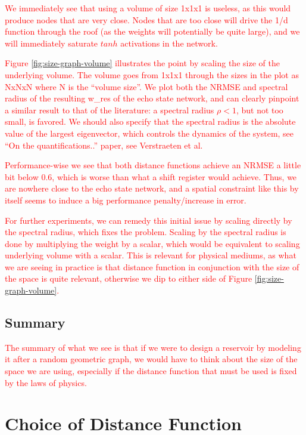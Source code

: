 \textcolor{red}{
  We immediately see that using a volume of size 1x1x1 is useless, as this would
produce nodes that are very close. Nodes that are too close will drive the 1/d
function through the roof (as the weights will potentially be quite large), and
we will immediately saturate $tanh$ activations in the network.
}

\textcolor{red}{
  Figure \ref{fig:size-graph-volume} illustrates the point by scaling the size
of the underlying volume. The volume goes from 1x1x1 through the sizes in the
plot as NxNxN where N is the ``volume size''. We plot both the NRMSE and
spectral radius of the resulting w_res of the echo state network, and can
clearly pinpoint a similar result to that of the literature: a spectral radius
$\rho < 1$, but not too small, is favored. We should also specify that the
spectral radius is the absolute value of the largest eigenvector, which controls
the dynamics of the system, see ``On the quantifications..'' paper, see
Verstraeten et al.
}

\textcolor{red}{
  Performance-wise we see that both distance functions achieve an NRMSE a little
bit below 0.6, which is worse than what a shift register would achieve. Thus, we
are nowhere close to the echo state network, and a spatial constraint like this
by itself seems to induce a big performance penalty/increase in error.
}

\textcolor{red}{
  For further experiments, we can remedy this initial issue by scaling directly
by the spectral radius, which fixes the problem. Scaling by the spectral radius
is done by multiplying the weight by a scalar, which would be equivalent to
scaling underlying volume with a scalar. This is relevant for physical mediums,
as what we are seeing in practice is that distance function in conjunction with
the size of the space is quite relevant, otherwise we dip to either side of
Figure \ref{fig:size-graph-volume}.
}

\subsection{Summary}

\textcolor{red}{
  The summary of what we see is that if we were to design a reservoir by
modeling it after a random geometric graph, we would have to think about the
size of the space we are using, especially if the distance function that must be
used is fixed by the laws of physics.
}

\section{Choice of Distance Function}

